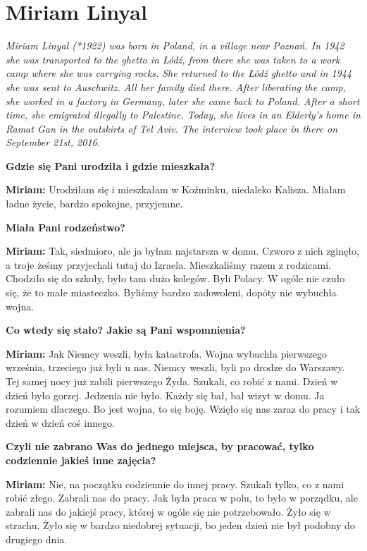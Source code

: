 \section{Miriam Linyal}
\begin{otherlanguage}{polish}
\textit{Miriam Linyal (*1922) was born in Poland, in a village near Poznań. In 1942 she was transported to the ghetto in Łódź, from there she was taken to a work camp where she was carrying rocks. She returned to the Łódź ghetto and in 1944 she was sent to Auschwitz. All her family died there. After liberating the camp, she worked in a factory in Germany, later she came back to Poland. After a short time, she emigrated illegally to Palestine. Today, she lives in an Elderly’s home in Ramat Gan in the outskirts of Tel Aviv. The interview took place in there on September 21st, 2016.}\par
\vspace*{2em}
\textbf{Gdzie się Pani urodziła i gdzie mieszkała?} 

\textbf{Miriam:} Urodziłam się i mieszkałam w Koźminku, niedaleko Kalisza. Miałam ładne życie, bardzo spokojne, przyjemne.

\textbf{Miała Pani rodzeństwo?} 

\textbf{Miriam:} Tak, siedmioro, ale ja byłam najstarsza w domu. Czworo z nich zginęło, a troje żeśmy przyjechali tutaj do Izraela. Mieszkaliśmy razem z rodzicami. Chodziło się do szkoły, było tam dużo kolegów. Byli Polacy. W ogóle nie czuło się, że to małe miasteczko. Byliśmy bardzo zadowoleni, dopóty nie wybuchła wojna.

\textbf{ Co wtedy się stało? Jakie są Pani wspomnienia?} 

\textbf{Miriam:} Jak Niemcy weszli, była katastrofa. Wojna wybuchła pierwszego września, trzeciego już byli u nas. Niemcy weszli, byli po drodze do Warszawy. Tej samej nocy już zabili pierwszego Żyda. Szukali, co robić z nami. Dzień w dzień było gorzej. Jedzenia nie było. Każdy się bał, bał wizyt w domu. Ja rozumiem dlaczego. Bo jest wojna, to się boję. Wzięło się nas zaraz do pracy i tak dzień w dzień coś innego.

\textbf{Czyli nie zabrano Was do jednego miejsca, by pracować, tylko codziennie jakieś inne zajęcia?} 

\textbf{Miriam:} Nie, na początku codziennie do innej pracy. Szukali tylko, co z nami robić złego. Zabrali nas do pracy. Jak była praca w polu, to było w porządku, ale zabrali nas do jakiejś pracy, której w ogóle się nie potrzebowało. Żyło się w strachu. Żyło się w bardzo niedobrej sytuacji, bo jeden dzień nie był podobny do drugiego dnia. 


\end{otherlanguage}
